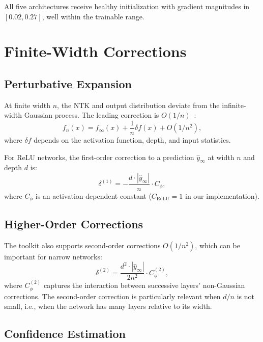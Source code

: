 \documentclass[10pt]{article}
\theoremstyle{definition}
\begin{document}
All five architectures receive healthy initialization with gradient magnitudes in $[0.02, 0.27]$, well within the trainable range.

\section{Finite-Width Corrections}
\label{sec:finite}

\subsection{Perturbative Expansion}

At finite width $n$, the NTK and output distribution deviate from the infinite-width Gaussian process.
The leading correction is $O(1/n)$~\citep{dyer2020asymptotics,huang2020dynamics}:
\begin{equation}
  f_n(x) = f_\infty(x) + \frac{1}{n} \delta f(x) + O(1/n^2),
  \label{eq:finite-correction}
\end{equation}
where $\delta f$ depends on the activation function, depth, and input statistics.

For ReLU networks, the first-order correction to a prediction $\hat{y}_\infty$ at width $n$ and depth $d$ is:
\begin{equation}
  \delta^{(1)} = -\frac{d \cdot |\hat{y}_\infty|}{n} \cdot C_\phi,
  \label{eq:first-order-correction}
\end{equation}
where $C_\phi$ is an activation-dependent constant ($C_{\text{ReLU}} = 1$ in our implementation).

\subsection{Higher-Order Corrections}

The toolkit also supports second-order corrections $O(1/n^2)$, which can be important for narrow networks:
\begin{equation}
  \delta^{(2)} = \frac{d^2 \cdot |\hat{y}_\infty|}{2 n^2} \cdot C_\phi^{(2)},
\end{equation}
where $C_\phi^{(2)}$ captures the interaction between successive layers' non-Gaussian corrections.
The second-order correction is particularly relevant when $d/n$ is not small, i.e., when the network has many layers relative to its width.

\subsection{Confidence Estimation}
\end{document}
